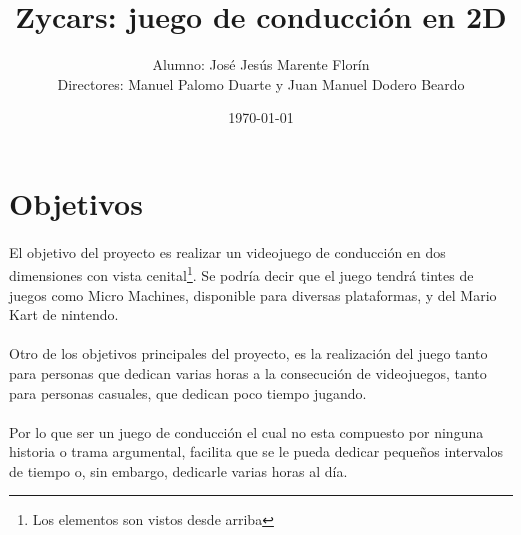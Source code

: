 \documentclass[a4paper,11pt]{article} %
\title{Zycars: juego de conducción en 2D} %
\author{Alumno: José Jesús Marente Florín\\Directores: Manuel Palomo Duarte y Juan Manuel Dodero Beardo} %
\date{\today} %
\begin{document}
\maketitle %


\tableofcontents %

\section{Objetivos}

\paragraph{}
El objetivo del proyecto es realizar un videojuego de conducción en dos dimensiones con vista cenital\footnote{Los elementos son
vistos desde arriba}. Se podría decir que el juego tendrá tintes de juegos como Micro Machines, disponible para diversas 
plataformas, y del Mario Kart de nintendo.

\paragraph{}
Otro de los objetivos principales del proyecto, es la realización del juego tanto para personas que
dedican varias horas a la consecución de videojuegos, tanto para personas casuales, que dedican poco tiempo
jugando.

\paragraph{}
Por lo que ser un juego de conducción el cual no esta compuesto por ninguna historia o trama argumental, facilita que se le pueda
dedicar pequeños intervalos de tiempo o, sin embargo, dedicarle varias horas al día.
\end{document}
